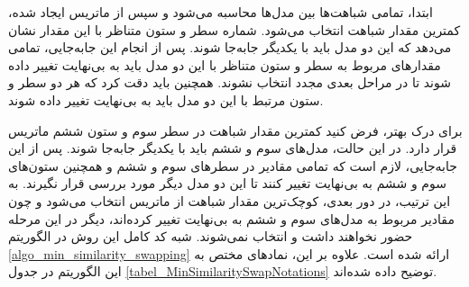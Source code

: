ابتدا، تمامی شباهت‌ها بین مدل‌ها محاسبه می‌شود و سپس از ماتریس ایجاد شده، کمترین مقدار شباهت انتخاب می‌شود. شماره سطر و ستون متناظر با این مقدار نشان می‌دهد که این دو مدل باید با یکدیگر جابه‌جا شوند. پس از انجام این جابه‌جایی، تمامی مقدارهای مربوط به سطر و ستون متناظر با این دو مدل باید به بی‌نهایت تغییر داده شوند تا در مراحل بعدی مجدد انتخاب نشوند. همچنین باید دقت کرد که هر دو سطر و ستون مرتبط با این دو مدل باید به بی‌نهایت تغییر داده شوند.

برای درک بهتر، فرض کنید کمترین مقدار شباهت در سطر سوم و ستون ششم ماتریس قرار دارد. در این حالت، مدل‌های سوم و ششم باید با یکدیگر جابه‌جا شوند. پس از این جابه‌جایی، لازم است که تمامی مقادیر در سطرهای سوم و ششم و همچنین ستون‌های سوم و ششم به بی‌نهایت تغییر کنند تا این دو مدل دیگر مورد بررسی قرار نگیرند. به این ترتیب، در دور بعدی، کوچک‌ترین مقدار شباهت از ماتریس انتخاب می‌شود و چون مقادیر مربوط به مدل‌های سوم و ششم به بی‌نهایت تغییر کرده‌اند، دیگر در این مرحله حضور نخواهند داشت و انتخاب نمی‌شوند. شبه کد کامل این روش در الگوریتم
\ref{algo_min_similarity_swapping}
ارائه شده است. علاوه بر این، نمادهای مختص به این الگوریتم در جدول
\ref{tabel_MinSimilaritySwapNotations}
توضیح داده شده‌اند.


\begin{LTR}
	\begin{algorithm}[t]
		\begin{RTL}
			\caption{%
				جابه‌جایی حداقل شباهت
			}
			\label{algo_min_similarity_swapping}
		\end{RTL}
		
		\begin{latin}
		\end{latin}
	\end{algorithm}
\end{LTR}



